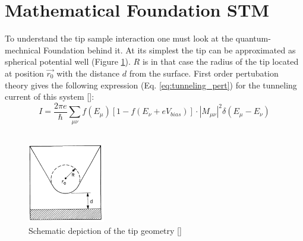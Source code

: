 \section{Mathematical Foundation STM}

To understand the tip sample interaction one must look at the quantum-mechnical Foundation behind it.
At its simplest the tip can be approximated as spherical potential well (Figure \ref{fig:tip_scheme}). $R$ is in that case the radius of the tip located at position $\vec{r_0}$ with the distance $d$ from the surface.
First order pertubation theory gives the following expression (Eq. \ref{eq:tunneling_pert}) for the tunneling current of this system [\cite{PhysRevLett}]:
\begin{equation}
    I = \frac{2 \pi e}{\hbar} \sum_{\mu \nu} f(E_{\mu})[1 - f(E_{\nu}+eV_{bias})]\cdot |M_{\mu \nu}|^2 \delta(E_{\mu}- E_{\nu})
    \label{eq:tunneling_pert}
\end{equation}\\

\begin{figure}
    \centering
    \includegraphics[width=0.3\textwidth]{graphics/fundamental_tip_sheme.PNG}
    \caption{Schematic depiction of the tip geometry [\cite{PhysRevLett}]}
    \label{fig:tip_scheme}
\end{figure}

